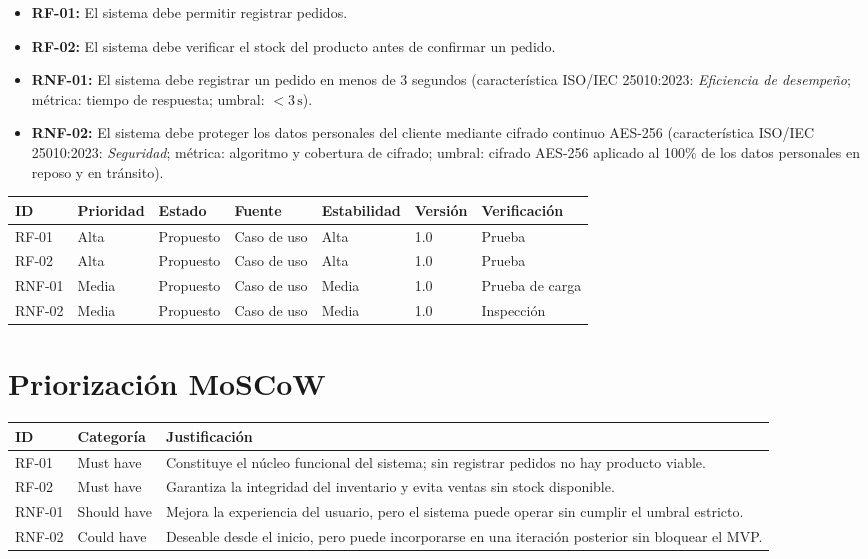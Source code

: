\documentclass[11pt,a4paper]{article}
\begin{document}
\begin{itemize}
    \item \textbf{RF-01:} El sistema debe permitir registrar pedidos.
    \item \textbf{RF-02:} El sistema debe verificar el stock del producto antes de confirmar un pedido.
    \item \textbf{RNF-01:} El sistema debe registrar un pedido en menos de 3 segundos
    (característica ISO/IEC 25010:2023: \emph{Eficiencia de desempeño}; métrica: tiempo de respuesta;
    umbral: $< 3\,\text{s}$).
    \item \textbf{RNF-02:} El sistema debe proteger los datos personales del cliente mediante cifrado
    continuo AES-256 (característica ISO/IEC 25010:2023: \emph{Seguridad}; métrica: algoritmo y
    cobertura de cifrado; umbral: cifrado AES-256 aplicado al 100\% de los datos personales en reposo
    y en tránsito).
\end{itemize}

\begin{center}
\begin{tabular}{@{}lllllll@{}}
\toprule
\textbf{ID} & \textbf{Prioridad} & \textbf{Estado} & \textbf{Fuente} & \textbf{Estabilidad} & \textbf{Versión} & \textbf{Verificación} \\
\midrule
RF-01  & Alta  & Propuesto & Caso de uso & Alta  & 1.0 & Prueba \\
RF-02  & Alta  & Propuesto & Caso de uso & Alta  & 1.0 & Prueba \\
RNF-01 & Media & Propuesto & Caso de uso & Media & 1.0 & Prueba de carga \\
RNF-02 & Media & Propuesto & Caso de uso & Media & 1.0 & Inspección \\
\bottomrule
\end{tabular}
\end{center}

\section{Priorización MoSCoW}

\begin{center}
\begin{tabular}{@{}lll@{}}
\toprule
\textbf{ID} & \textbf{Categoría} & \textbf{Justificación} \\
\midrule
RF-01  & Must have   & Constituye el núcleo funcional del sistema; sin registrar pedidos no hay producto viable. \\
RF-02  & Must have   & Garantiza la integridad del inventario y evita ventas sin stock disponible. \\
RNF-01 & Should have & Mejora la experiencia del usuario, pero el sistema puede operar sin cumplir el umbral estricto. \\
RNF-02 & Could have  & Deseable desde el inicio, pero puede incorporarse en una iteración posterior sin bloquear el MVP. \\
\bottomrule
\end{tabular}
\end{center}
\end{document}
